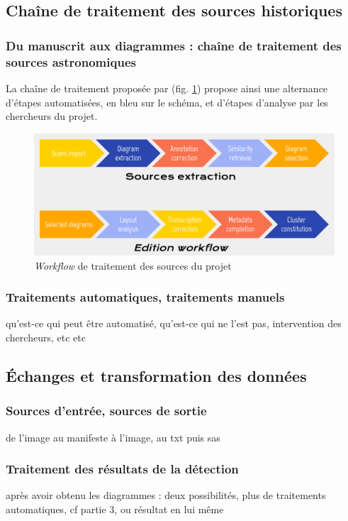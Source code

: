 
\subsection{Chaîne de traitement des sources historiques}
    \subsubsection{Du manuscrit aux diagrammes : chaîne de traitement des sources astronomiques}
	La chaîne de traitement proposée par \eida (fig. \ref{fig:eida_workflow}) propose ainsi une alternance d'étapes automatisées, en bleu sur le schéma, et d'étapes d'analyse par les chercheurs du projet.
	
	\begin{figure}[h]
		\centering
		\includegraphics[width=15cm]{images/eida_workflow.png}
		\caption{\textit{Workflow} de traitement des sources du projet \eida}
		\label{fig:eida_workflow}
	\end{figure}

    \subsubsection{Traitements automatiques, traitements manuels}
	qu'est-ce qui peut être automatisé, qu'est-ce qui ne l'est pas, intervention des chercheurs, etc etc
    
    \subsection{Échanges et transformation des données}
        \subsubsection{Sources d'entrée, sources de sortie}
		de l'image au manifeste à l'image, au txt puis sas

        \subsubsection{Traitement des résultats de la détection}
        après avoir obtenu les diagrammes : deux possibilités, plus de traitements automatiques, cf partie 3, ou résultat en lui même
        
